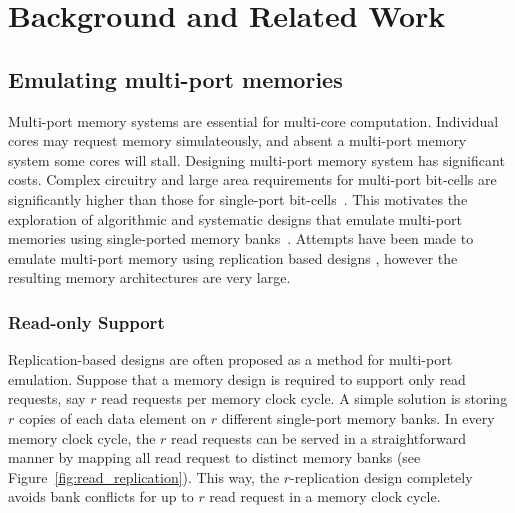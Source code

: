 \section{Background and Related Work}
\label{sec:bg}

\subsection{Emulating multi-port memories}
\label{sec:emulation}

Multi-port memory systems are essential for multi-core computation. Individual cores may request memory simulateously, and absent a multi-port memory system some cores will stall. Designing multi-port memory system has significant costs. Complex circuitry and large area requirements for multi-port bit-cells are significantly higher than those for single-port bit-cells~\cite{Suzuki,WLCH14}. This motivates the exploration of algorithmic and systematic designs that emulate multi-port memories using single-ported memory banks~\cite{ACP88, EMY91, RG91,Memoir_xor, Memoir_xor_virtual}. Attempts have been made to emulate multi-port memory using replication based designs \cite{CCES93}, however the resulting memory architectures are very large. 


\subsubsection{Read-only Support} 
\label{sec:read_only}
Replication-based designs are often proposed as a method for multi-port emulation. Suppose that a memory design is required to support only read requests, say $r$ read requests per memory clock cycle. A simple solution is storing $r$ copies of each data element on $r$ different single-port memory banks. In every memory clock cycle, the $r$ read requests can be served in a straightforward manner by mapping all read request to distinct memory banks (see Figure~\ref{fig:read_replication}). This way, the $r$-replication design completely avoids bank conflicts for up to $r$ read request in a memory clock cycle. 

